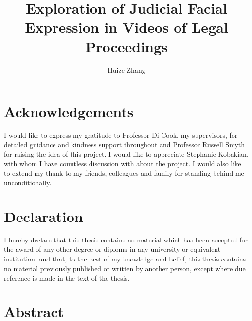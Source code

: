 \documentclass{monashthesis}
\author{Huize Zhang}
\title{Exploration of Judicial Facial Expression in Videos of Legal Proceedings}
\begin{document}

\titlepage

{\sf\tighttoc\doublespacing}

\clearpage{}\setcounter{page}{0}

\hypertarget{acknowledgements}{%
\chapter*{Acknowledgements}\label{acknowledgements}}

I would like to express my gratitude to Professor Di Cook, my supervisors, for detailed guidance and kindness support throughout and Professor Russell Smyth for raising the idea of this project. I would like to appreciate Stephanie Kobakian, with whom I have countless discussion with about the project. I would also like to extend my thank to my friends, colleagues and family for standing behind me unconditionally.

\let\cleardoublepage\clearpage

\hypertarget{declaration}{%
\chapter*{Declaration}\label{declaration}}

I hereby declare that this thesis contains no material which has been accepted for the award of any other degree or diploma in any university or equivalent institution, and that, to the best of my knowledge and belief, this thesis contains no material previously published or written by another person, except where due reference is made in the text of the thesis.

\vspace*{2cm}\par\authorname
\let\cleardoublepage\clearpage

\hypertarget{abstract}{%
\chapter*{Abstract}\label{abstract}}
\end{document}
